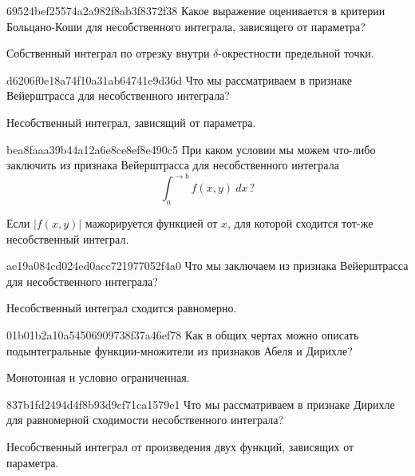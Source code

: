 \begin{note}{69524bef25574a2a982f8ab3f8372f38}
    Какое выражение оценивается в критерии Больцано-Коши для несобственного интеграла, зависящего от параметра?

    \begin{cloze}{1}
        Собственный интеграл по отрезку внутри \({ \delta }\)-окрестности предельной точки.
    \end{cloze}
\end{note}

\begin{note}{d6206f0e18a74f10a31ab64741e9d36d}
    Что мы рассматриваем в признаке Вейерштрасса для несобственного интеграла?

    \begin{cloze}{1}
        Несобственный интеграл, зависящий от параметра.
    \end{cloze}
\end{note}

\begin{note}{bea8faaa39b44a12a6e8ce8ef8e490c5}
    При каком условии мы можем что-либо заключить из признака Вейерштрасса для несобственного интеграла
    \[
        \int_{a}^{\to b} f(x, y)\: dx\,?
    \]

    \begin{cloze}{1}
        Если \({ \left\lvert f(x, y) \right\rvert }\) мажорируется функцией от \({ x }\), для которой сходится тот-же несобственный интеграл.
    \end{cloze}
\end{note}

\begin{note}{ae19a084cd024ed0acc721977052f4a0}
    Что мы заключаем из признака Вейерштрасса для несобственного интеграла?

    \begin{cloze}{1}
        Несобственный интеграл сходится равномерно.
    \end{cloze}
\end{note}

\begin{note}{01b01b2a10a54506909738f37a46ef78}
    Как в общих чертах можно описать подынтегральные функции-множители из признаков Абеля и Дирихле?

    \begin{cloze}{1}
        Монотонная и условно ограниченная.
    \end{cloze}
\end{note}

\begin{note}{837b1fd2494d4f8b93d9cf71ca1579e1}
    Что мы рассматриваем в признаке Дирихле для равномерной сходимости несобственного интеграла?

    \begin{cloze}{1}
        Несобственный интеграл от произведения двух функций, зависящих от параметра.
    \end{cloze}
\end{note}

